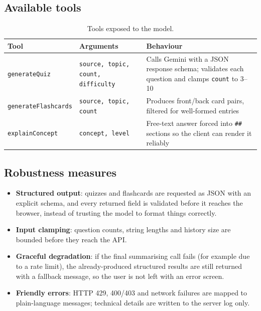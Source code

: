 \documentclass[11pt,a4paper]{article}
\begin{document}
\subsection*{Available tools}
\begin{table}[h]
\centering
\caption{Tools exposed to the model.}
\begin{tabular}{@{}lp{4.4cm}p{6.4cm}@{}}
\toprule
\textbf{Tool} & \textbf{Arguments} & \textbf{Behaviour} \\
\midrule
\texttt{generateQuiz} & \texttt{source, topic, count, difficulty}
  & Calls Gemini with a JSON response schema; validates each question and clamps \texttt{count} to 3--10 \\
\texttt{generateFlashcards} & \texttt{source, topic, count}
  & Produces front/back card pairs, filtered for well-formed entries \\
\texttt{explainConcept} & \texttt{concept, level}
  & Free-text answer forced into \texttt{\#\#} sections so the client can render it reliably \\
\bottomrule
\end{tabular}
\end{table}

\subsection*{Robustness measures}
\begin{itemize}[leftmargin=*]
  \item \textbf{Structured output}: quizzes and flashcards are requested as JSON with an
        explicit schema, and every returned field is validated before it reaches the browser,
        instead of trusting the model to format things correctly.
  \item \textbf{Input clamping}: question counts, string lengths and history size are bounded
        before they reach the API.
  \item \textbf{Graceful degradation}: if the final summarising call fails (for example due to a
        rate limit), the already-produced structured results are still returned with a fallback
        message, so the user is not left with an error screen.
  \item \textbf{Friendly errors}: HTTP 429, 400/403 and network failures are mapped to plain-language
        messages; technical details are written to the server log only.
\end{itemize}

\end{document}
